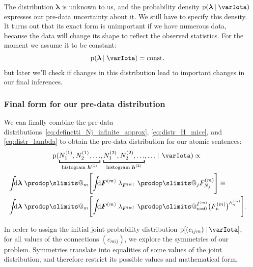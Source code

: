 \documentclass[\ifafour a4paper,12pt,\else a5paper,10pt,\fi%
onecolumn,oneside,article,%
british%
]{memoir}
\makeatletter
\theoremstyle{remark}
\theoremstyle{innote}
\def\prod{\DOTSI\prodop\slimits@}
\newcommand*{\di}{\mathrm{d}}%
\newcommand*{\pf}{\mathrm{p}}%
\renewcommand*{\|}[1][]{\nonscript\,#1\vert\nonscript\;\mathopen{}}
\newcommand*{\yI}{\varIota}
\newcommand*{\yc}{c}
\newcommand*{\yF}{\bm{F}}
\newcommand*{\yFm}[1][m]{\yF^{(#1)}}
\newcommand*{\yFFm}[1][m]{F^{(#1)}}
\newcommand*{\yh}{\bm{h}}
\newcommand*{\yhm}[1][m]{\yh^{(#1)}}
\newcommand*{\yIm}[1][m]{I^{(#1)}}
\newcommand*{\yNm}[1][m]{N^{(#1)}}
\newcommand*{\yll}{\lambda}
\newcommand*{\yl}{\bm{\yll}}
\makeatother
\begin{document}
The distribution $\yl$ is unknown to us, and the probability density
$\pf(\yl \| \yI)$ expresses our pre-data uncertainty about it. We still
have to specify this density. It turns out that its exact form is
unimportant if we have numerous data, because the data will change its
shape to reflect the observed statistics.
For the moment we assume it to be constant:
\begin{equation}
  \label{eq:distr_lambda}
  \pf(\yl \| \yI) = \text{const.}
\end{equation}
but later we'll check if changes in this distribution lead to important
changes in our final inferences.


\subsubsection{Final form for our pre-data distribution}
\label{sec:final_predata}

We can finally combine the pre-data
distributions~\eqref{eq:definetti_Nj_infinite_approx},
\eqref{eq:distr_H_mice}, and \eqref{eq:distr_lambda} to obtain the pre-data
distribution for our atomic sentences:
\begin{multline}
  \label{eq:pre-data_final}
  \pf(\underbracket{\yNm[1]_{1},\yNm[1]_{2},\dotsc}_{\text{histogram $\yhm[1]$}},
  \underbracket{\yNm[2]_{1},\yNm[2]_{2},\dotsc}_{\text{histogram $\yhm[2]$}},
  \dotsc   \| \yI)
  \propto{}\\
  \begin{aligned}
  &\int\!\!\!\di\yl\;\prod_{m}\Biggl[\int\!\!\!\di\yFm\;
  \yll_{\yFm} \;
  \prod_{j} \yFFm_{N_{j}}
  \Biggr]
\equiv{}\\
  &\int\!\!\!\di\yl\;\prod_{m}\Biggl[\int\!\!\!\di\yFm\;
  \yll_{\yFm} \;
  \prod_{n=0}^{\yIm} \bigl(\yFFm_{n}\bigr)^{h^{(m)}_{n}}
  \Biggr].
  \end{aligned}
\end{multline}



\bigskip


In order to assign the initial joint probability distribution
$\pf[(\yc_{ijm}) \| \yI]$, for all values of the connections $(\yc_{mij})$,
we explore the symmetries of our problem. Symmetries translate into
equalities of some values of the joint distribution, and therefore restrict
its possible values and mathematical form.
\end{document}

